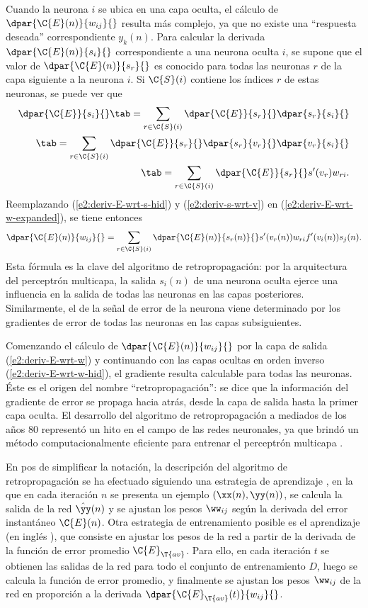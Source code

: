 Cuando la neurona $i$ se ubica en una capa oculta, el cálculo de
$\dpar{\C{E}(n)}{w_{ij}}{}$ resulta más complejo, ya que no existe una
``respuesta deseada'' correspondiente $y_k(n)$.
Para calcular la derivada $\dpar{\C{E}(n)}{s_{i}}{}$ correspondiente a
una neurona oculta $i$, se supone que el valor de
$\dpar{\C{E}(n)}{s_r}{}$ es conocido para todas las neuronas $r$ de la
capa siguiente a la neurona $i$.
Si $\C{S}(i)$ contiene los índices $r$ de estas neuronas, se puede ver
que
%
\begin{align}
  \dpar{\C{E}}{s_i}{} \tab= \sum_{r\in\C{S}(i)}
      \dpar{\C{E}}{s_r}{}\dpar{s_r}{s_i}{} \notag\\
    \tab= \sum_{r\in\C{S}(i)}
      \dpar{\C{E}}{s_r}{}\dpar{s_r}{v_r}{}\dpar{v_r}{s_i}{} \notag\\
    \tab= \sum_{r\in\C{S}(i)} \dpar{\C{E}}{s_r}{} s'(v_r) w_{ri}.
    \label{e2:deriv-E-wrt-s-hid}
\end{align}
%
Reemplazando (\ref{e2:deriv-E-wrt-s-hid}) y (\ref{e2:deriv-s-wrt-v})
en (\ref{e2:deriv-E-wrt-w-expanded}), se tiene entonces
%
\begin{align}\label{e2:deriv-E-wrt-w-hid}
  \dpar{\C{E}(n)}{w_{ij}}{} =
  \sum_{r\in\C{S}(i)} \dpar{\C{E}(n)}{s_r(n)}{} s'(v_r(n)) w_{ri}
  f'(v_i(n)) s_j(n).
\end{align}
%
Esta fórmula es la clave del algoritmo de retropropagación: por la
arquitectura del perceptrón multicapa, la salida $s_i(n)$ de una
neurona oculta ejerce una influencia en la salida de todas las
neuronas en las capas posteriores.
Similarmente, el  de la señal de error de la
neurona viene determinado por los gradientes de error de todas las
neuronas en las capas subsiguientes.

Comenzando el cálculo de $\dpar{\C{E}(n)}{w_{ij}}{}$ por la capa de
salida (\ref{e2:deriv-E-wrt-w}) y continuando con las capas ocultas en
orden inverso (\ref{e2:deriv-E-wrt-w-hid}), el gradiente resulta
calculable para todas las neuronas.
Éste es el origen del nombre ``retropropagación'': se dice que la
información del gradiente de error se propaga hacia atrás, desde la
capa de salida hasta la primer capa oculta.
El desarrollo del algoritmo de retropropagación a mediados de los años
$80$ representó un hito en el campo de las redes neuronales, ya que
brindó un método computacionalmente eficiente para entrenar el
perceptrón multicapa \cite{haykin}.

En pos de simplificar la notación, la descripción del algoritmo de
retropropagación se ha efectuado siguiendo una estrategia de
aprendizaje , en la que en cada iteración $n$ se presenta
un ejemplo $(\xx(n),\yy(n))$, se calcula la salida de la red
$\hat{\yy}(n)$ y se ajustan los pesos $\ww_{ij}$ según la derivada del
error instantáneo $\C{E}(n)$.
Otra estrategia de entrenamiento posible es el aprendizaje  (en inglés ), que consiste en ajustar los
pesos de la red a partir de la derivada de la función de error
promedio $\C{E}_{\T{av}}$.
Para ello, en cada iteración $t$ se obtienen las salidas de la red
para todo el conjunto de entrenamiento $D$, luego se calcula la
función de error promedio, y finalmente se ajustan los pesos
$\ww_{ij}$ de la red en proporción a la derivada
$\dpar{\C{E}_{\T{av}}(t)}{w_{ij}}{}$.
